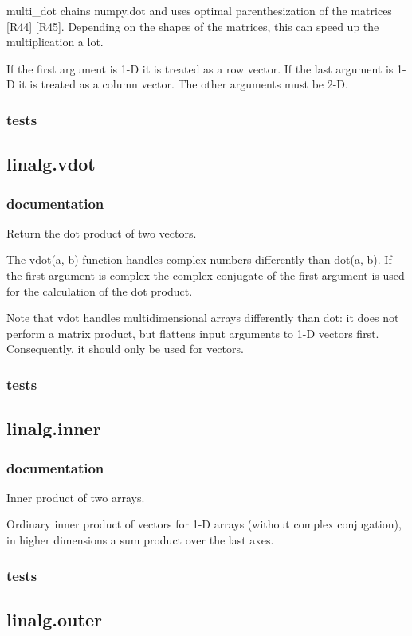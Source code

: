 \documentclass[a4paper,11pt]{article}
\begin{document}
multi\_dot chains numpy.dot and uses optimal parenthesization of the matrices [R44] [R45]. Depending on the shapes of the matrices, this can speed up the multiplication a lot.

If the first argument is 1-D it is treated as a row vector. If the last argument is 1-D it is treated as a column vector. The other arguments must be 2-D.
\subsubsection{tests}

\subsection{linalg.vdot}

\subsubsection{documentation}
Return the dot product of two vectors.

The vdot(a, b) function handles complex numbers differently than dot(a, b). If the first argument is complex the complex conjugate of the first argument is used for the calculation of the dot product.

Note that vdot handles multidimensional arrays differently than dot: it does not perform a matrix product, but flattens input arguments to 1-D vectors first. Consequently, it should only be used for vectors.
\subsubsection{tests}

\subsection{linalg.inner}
\subsubsection{documentation}
Inner product of two arrays.

Ordinary inner product of vectors for 1-D arrays (without complex conjugation), in higher dimensions a sum product over the last axes.

\subsubsection{tests}
\subsection{linalg.outer}
\end{document}
